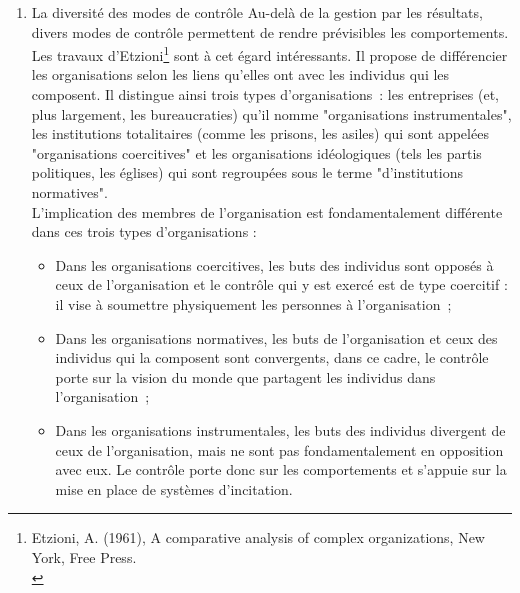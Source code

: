 \documentclass{tufte-handout}
\begin{document}
\begin{enumerate}
\item La diversité des modes de contrôle
\label{sec:org2c7a0e9}
Au-delà de la gestion par les résultats, divers modes de contrôle permettent de rendre prévisibles les comportements. Les travaux d'Etzioni\footnote{Etzioni, A. (1961), A comparative analysis of complex organizations, New York, Free Press.\\} sont à cet égard intéressants. Il propose de différencier les organisations selon les liens qu'elles ont avec les individus qui les composent. Il distingue ainsi trois types d'organisations : les entreprises (et, plus largement, les bureaucraties) qu'il nomme "organisations instrumentales", les institutions totalitaires (comme les prisons, les asiles) qui sont appelées "organisations coercitives" et les organisations idéologiques (tels les partis politiques, les églises) qui sont regroupées sous le terme "d'institutions normatives".\\

L'implication des membres de l'organisation est fondamentalement différente dans ces trois types d'organisations :\\
\begin{itemize}
\item Dans les organisations coercitives, les buts des individus sont opposés à ceux de l'organisation et le contrôle qui y est exercé est de type coercitif : il vise à soumettre physiquement les personnes à l'organisation ;\\
\item Dans les organisations normatives, les buts de l'organisation et ceux des individus qui la composent sont convergents, dans ce cadre, le contrôle porte sur la vision du monde que partagent les individus dans l'organisation ;\\
\item Dans les organisations instrumentales, les buts des individus divergent de ceux de l'organisation, mais ne sont pas fondamentalement en opposition avec eux. Le contrôle porte donc sur les comportements et s'appuie sur la mise en place de systèmes d'incitation.\\
\end{itemize}


\end{enumerate}
\end{document}
